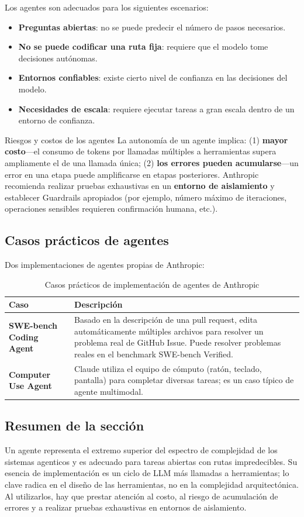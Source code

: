 Los agentes son adecuados para los siguientes escenarios:
\begin{itemize}
    \item \textbf{Preguntas abiertas}: no se puede predecir el número de pasos necesarios.
    \item \textbf{No se puede codificar una ruta fija}: requiere que el modelo tome decisiones autónomas.
    \item \textbf{Entornos confiables}: existe cierto nivel de confianza en las decisiones del modelo.
    \item \textbf{Necesidades de escala}: requiere ejecutar tareas a gran escala dentro de un entorno de confianza.
\end{itemize}

\begin{warningbox}{Riesgos y costos de los agentes}
La autonomía de un agente implica: (1) \textbf{mayor costo}—el consumo de tokens por llamadas múltiples a herramientas supera ampliamente el de una llamada única; (2) \textbf{los errores pueden acumularse}—un error en una etapa puede amplificarse en etapas posteriores. Anthropic recomienda realizar pruebas exhaustivas en un \textbf{entorno de aislamiento} y establecer Guardrails apropiados (por ejemplo, número máximo de iteraciones, operaciones sensibles requieren confirmación humana, etc.).
\end{warningbox}

\subsection{Casos prácticos de agentes}

Dos implementaciones de agentes propias de Anthropic:

\begin{table}[H]
\centering
\begin{tabular}{>{\bfseries}p{3.5cm} p{9cm}}
\toprule
Caso & Descripción \\
\midrule
SWE-bench Coding Agent & Basado en la descripción de una pull request, edita automáticamente múltiples archivos para resolver un problema real de GitHub Issue. Puede resolver problemas reales en el benchmark SWE-bench Verified. \\
Computer Use Agent & Claude utiliza el equipo de cómputo (ratón, teclado, pantalla) para completar diversas tareas; es un caso típico de agente multimodal. \\
\bottomrule
\end{tabular}
\caption{Casos prácticos de implementación de agentes de Anthropic}
\end{table}

\subsection{Resumen de la sección}
Un agente representa el extremo superior del espectro de complejidad de los sistemas agenticos y es adecuado para tareas abiertas con rutas impredecibles. Su esencia de implementación es un ciclo de LLM más llamadas a herramientas; lo clave radica en el diseño de las herramientas, no en la complejidad arquitectónica. Al utilizarlos, hay que prestar atención al costo, al riesgo de acumulación de errores y a realizar pruebas exhaustivas en entornos de aislamiento.
